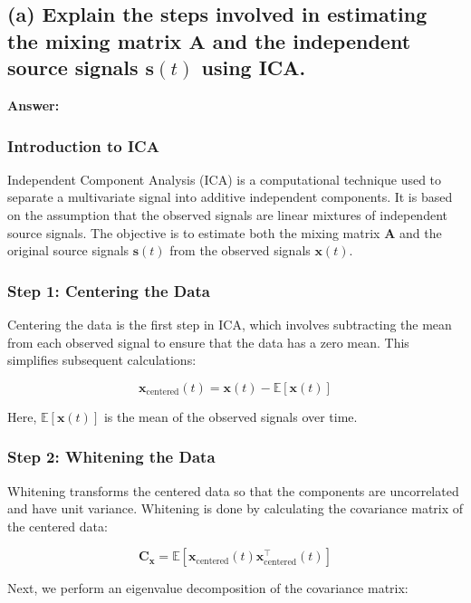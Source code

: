 \documentclass{exam}
\begin{document}
\subsection{(a) Explain the steps involved in estimating the mixing matrix \texorpdfstring{$\mathbf{A}$}{A} and the independent source signals \texorpdfstring{$\mathbf{s}(t)$}{s(t)} using ICA.}

\textbf{Answer:}

\subsubsection{Introduction to ICA}

Independent Component Analysis (ICA) is a computational technique used to separate a multivariate signal into additive independent components. It is based on the assumption that the observed signals are linear mixtures of independent source signals. The objective is to estimate both the mixing matrix \( \mathbf{A} \) and the original source signals \( \mathbf{s}(t) \) from the observed signals \( \mathbf{x}(t) \).

\subsubsection{Step 1: Centering the Data}

Centering the data is the first step in ICA, which involves subtracting the mean from each observed signal to ensure that the data has a zero mean. This simplifies subsequent calculations:

\[
\mathbf{x}_{\text{centered}}(t) = \mathbf{x}(t) - \mathbb{E}[\mathbf{x}(t)]
\]

Here, \( \mathbb{E}[\mathbf{x}(t)] \) is the mean of the observed signals over time.

\subsubsection{Step 2: Whitening the Data}

Whitening transforms the centered data so that the components are uncorrelated and have unit variance. Whitening is done by calculating the covariance matrix of the centered data:

\[
\mathbf{C}_{\mathbf{x}} = \mathbb{E}[\mathbf{x}_{\text{centered}}(t) \mathbf{x}_{\text{centered}}^\top(t)]
\]

Next, we perform an eigenvalue decomposition of the covariance matrix:
\end{document}
